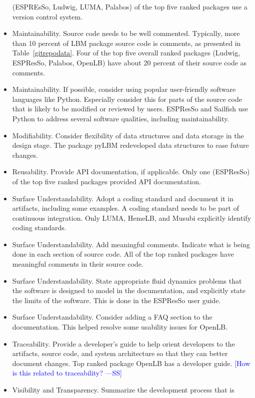 \documentclass[final, 3p, times, authoryear]{elsarticle}
\newcommand{\authornote}[3]{\textcolor{#1}{[#3 ---#2]}}
\newcommand{\authornote}[3]{}
\newcommand{\wss}[1]{\authornote{blue}{SS}{#1}} %
\begin{document}
\begin{itemize}
	(ESPREsSo, Ludwig, LUMA, Palabos) of the top five ranked packages use a
	version control system.
	\item Maintainability. Source code needs to be well commented. Typically,
	more than 10 percent of LBM package source code is comments, as presented in
	Table~\ref{gitrepodata}. Four of the top five overall ranked packages
	(Ludwig, ESPResSo, Palabos, OpenLB) have about 20 percent of their source
	code as comments.
	\item Maintainability. If possible, consider using popular user-friendly
	software languages like Python. Especially consider this for parts of the
	source code that is likely to be modified or reviewed by users. ESPResSo and
	Sailfish use Python to address several software qualities, including
	maintainability.
	\item Modifiability. Consider flexibility of data structures and data
	storage in the design stage. The package pyLBM redeveloped data structures
	to ease future changes.
	\item Reusability. Provide API documentation, if applicable. Only one
	(ESPResSo) of the top five ranked packages provided API documentation.
	\item Surface Understandability. Adopt a coding standard and document it in
	artifacts, including some examples. A coding standard needs to be part of
	continuous integration. Only LUMA, HemeLB, and Musubi explicitly identify
	coding standards. 
	\item Surface Understandability. Add meaningful comments. Indicate what is
	being done in each section of source code. All of the top ranked packages
	have meaningful comments in their source code.
	\item Surface Understandability. State appropriate fluid dynamics problems
	that the software is designed to model in the documentation, and explicitly
	state the limits of the software. This is done in the ESPResSo user guide. 
	\item Surface Understandability. Consider adding a FAQ section to the
	documentation. This helped resolve some usability issues for OpenLB.
	\item Traceability. Provide a developer's guide to help orient developers to
	the artifacts, source code, and system architecture so that they can better
	document changes. Top ranked package OpenLB has a developer guide. \wss{How
	is this related to traceability?}
	\item Visibility and Transparency. Summarize the development process that is

\end{itemize}
\end{document}
